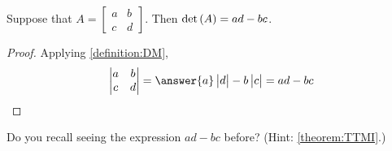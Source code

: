 \documentclass{ximera}
\begin{document}
\begin{theorem}
\label{theorem:DMST}

Suppose that $A=\begin{bmatrix}a&b\\c&d\end{bmatrix}$.  Then
$\det\left(A\right)=ad-bc$.

\begin{proof}
  Applying \ref{definition:DM},
  \[
    \begin{vmatrix}
      a&b\\c&d
    \end{vmatrix}=
    \answer{a}\begin{vmatrix}d\end{vmatrix}-b\begin{vmatrix}c\end{vmatrix}=ad-bc
  \]
\end{proof}
\end{theorem}

Do you recall seeing the expression $ad-bc$ before?  (Hint: \ref{theorem:TTMI}.)
\end{document}
